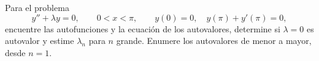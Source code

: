 Para el problema
\[y''+\lambda y=0,\qquad0<x<\pi,\qquad y(0)=0,\quad y(\pi)+y'(\pi)=0,\]
encuentre las autofunciones y la ecuación de los autovalores, determine si $\lambda=0$ es autovalor y estime $\lambda_n$ para $n$ grande. Enumere los autovalores de menor a mayor, desde $n=1$.
